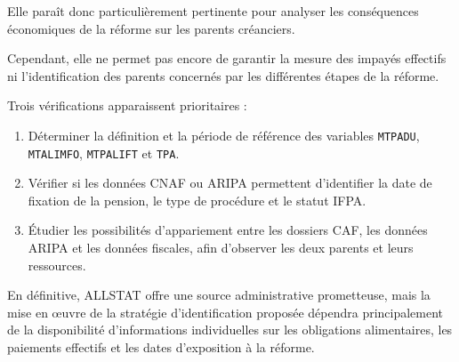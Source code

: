\documentclass[11pt,a4paper]{article}
\begin{document}
Elle paraît donc
particulièrement pertinente
pour analyser
les conséquences
économiques de la réforme
sur les parents créanciers.

Cependant, elle ne
permet pas encore
de garantir la mesure
des impayés effectifs
ni l'identification
des parents concernés
par les différentes
étapes de la réforme.

Trois vérifications
apparaissent prioritaires :

\begin{enumerate}
    \item Déterminer la définition
    et la période de référence
    des variables
    \texttt{MTPADU},
    \texttt{MTALIMFO},
    \texttt{MTPALIFT}
    et \texttt{TPA}.

    \item Vérifier si les
    données CNAF ou ARIPA
    permettent d'identifier
    la date de fixation
    de la pension,
    le type de procédure
    et le statut IFPA.

    \item Étudier les possibilités
    d'appariement entre
    les dossiers CAF,
    les données ARIPA
    et les données fiscales,
    afin d'observer
    les deux parents
    et leurs ressources.
\end{enumerate}

En définitive, ALLSTAT
offre une source
administrative prometteuse,
mais la mise en œuvre
de la stratégie
d'identification proposée
dépendra principalement
de la disponibilité
d'informations individuelles
sur les obligations
alimentaires,
les paiements effectifs
et les dates d'exposition
à la réforme.
\end{document}
